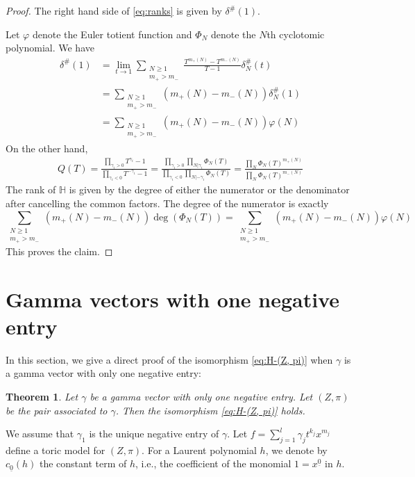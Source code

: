 \documentclass[11pt, reqno]{amsart}
\theoremstyle{plain}
\newtheorem{thm}{Theorem}[section]
\theoremstyle{definition}
\newcommand{\HH}{\mathbb{H}}
\newcommand{\ga}{\gamma}
\begin{document}
\begin{proof}
The right hand side of \eqref{eq:ranks} is given by $\delta^\#(1)$.

Let $\varphi$ denote the Euler totient function and $\Phi_N$ denote the $N$th cyclotomic polynomial. We have
    \begin{align*}
       \delta^\#(1)&= \lim_{t \to 1} \sum_{\substack{N\ge1\\ m_+ > m_-}}  \frac{T^{m_+(N)}-T^{m_-(N)}}{T-1} \delta_N^{\#}(t) \\
        &=\sum_{\substack{N\ge1\\ m_+ > m_-}}  \left( m_{+}(N)-m_-(N) \right) \delta_N^\#(1)\\
        &= \sum_{\substack{N\ge1\\ m_+ > m_-}}  \left( m_{+}(N)-m_-(N) \right) \varphi(N)
    \end{align*}
On the other hand,
\begin{align*}
  Q(T)=  \frac{\prod_{\gamma_i>0} T^{\gamma_i}-1}{\prod_{\gamma_i<0} T^{-\gamma_i}-1}  =  \frac{\prod_{\gamma_i>0}\prod_{N | \gamma_i} \Phi_N(T)}{\prod_{\gamma_i<0}\prod_{N | -\gamma_i} \Phi_N(T)}
    =  \frac{\prod_N \Phi_N(T)^{m_{+}(N)}}{\prod_N \Phi_N(T)^{m_{-}(N)}}
\end{align*}
The rank of $\HH$ is given by the degree of either the numerator or the denominator after cancelling the common factors. The degree of the numerator is exactly
\[\sum_{\substack{N \ge 1\\m_+>m_-}} \left(m_+(N)-m_-(N)\right) \deg (\Phi_N(T)) = \sum_{\substack{N \ge 1\\m_+>m_-}}  \left(m_+(N)-m_-(N)\right) \varphi(N)\]
This proves the claim.
\end{proof}



\section{Gamma vectors with one negative entry} \label{sec:multinomial}
In this section, we give a direct proof of the isomorphism \eqref{eq:H-(Z, pi)} when $\gamma$ is a gamma vector with only one negative entry:
\begin{thm}\label{thm:one-negative-gamma}
Let $\ga$ be a gamma vector with only one negative entry. Let $(Z, \pi)$ be the pair associated to $\gamma$. Then the isomorphism \eqref{eq:H-(Z, pi)} holds.
\end{thm}

We assume that $\ga_1$ is the unique negative entry of $\ga$. 
Let $f = \sum_{j=1}^{l} \gamma_j t^{k_j} x^{m_j}$ define a toric model for $(Z, \pi)$. For a Laurent polynomial $h$, we denote by $c_{\underline{0}}(h)$ the constant term of $h$, i.e., the coefficient of the monomial $1=x^{\underline{0}}$ in $h$.
\smallskip
\end{document}
